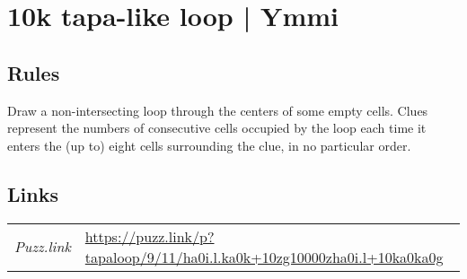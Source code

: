 \section[10k tapa-like loop | Ymmi {[\emph{Tapa-Like Loop}]}]{10k tapa-like loop | {\normalfont Ymmi}}
\label{sec:04-10k-tapa-like-loop-ymmi}

\subsection*{Rules}
\begin{markdown}
Draw a non-intersecting loop through the centers of some empty cells. Clues represent the numbers of consecutive cells occupied by the loop each time it enters the (up to) eight cells surrounding the clue, in no particular order.
\end{markdown}
\subsection*{Links}
\begin{tabularx}{\textwidth}{l X}
\emph{Puzz.link} & \url{https://puzz.link/p?tapaloop/9/11/ha0i.l.ka0k+10zg10000zha0i.l+10ka0ka0g} \\
\end{tabularx}
\pagebreak
